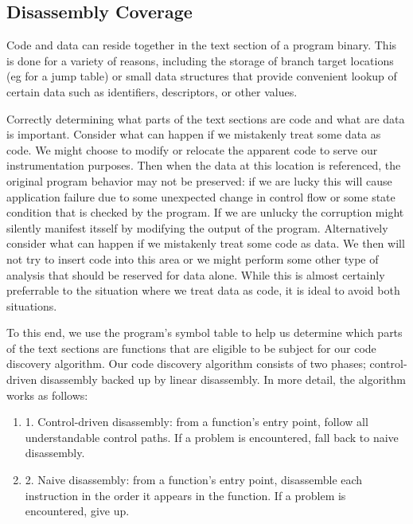 \subsection{Disassembly Coverage}
Code and data can reside together in the text section of a program binary. This is done for a variety of reasons, including
the storage of branch target locations (eg for a jump table) or small data structures that provide convenient lookup
of certain data such as identifiers, descriptors, or other values.

Correctly determining
what parts of the text sections are code and what are data is important. Consider what can happen
if we mistakenly treat some data as code. We might choose to modify or relocate the apparent code
to serve our instrumentation purposes. Then when the data at this location is referenced, the
original program behavior may not be preserved: if we are lucky this will cause application failure
due to some unexpected change in control flow or some state condition that is checked by the program.
If we are unlucky the corruption might silently manifest itsself by modifying the output of the
program. Alternatively consider what can happen if we mistakenly treat some code as data. We then will
not try to insert code into this area or we might perform some other type of analysis that should be reserved for
data alone. While this is almost certainly preferrable to the situation where we treat data as code, it
is ideal to avoid both situations.

To this end, we use the program's symbol table to help us determine which parts of the text sections
are functions that are eligible to be subject for our code discovery algorithm. Our code discovery algorithm
consists of two phases; control-driven disassembly backed up by linear disassembly. In more detail, the algorithm
works as follows:

\begin{enumerate}
\item 
1. Control-driven disassembly: from a function's entry point, follow all understandable control paths. If a problem is encountered, fall back to
naive disassembly.
\item
2. Naive disassembly: from a function's entry point, disassemble each instruction in the order it appears in the
function. If a problem is encountered, give up.
\end{enumerate}


